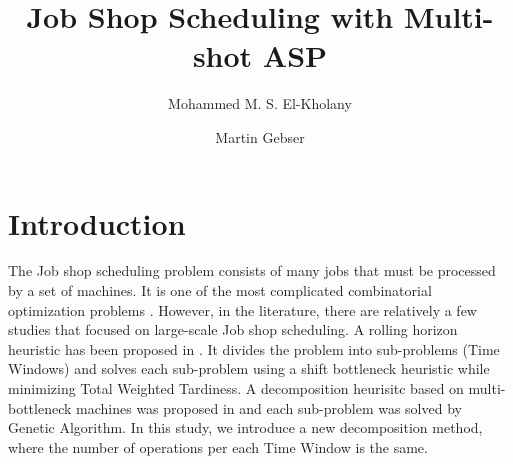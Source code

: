 \documentclass[runningheads]{llncs}
\begin{document}
%
\title{ Job Shop Scheduling with Multi-shot ASP}
%
%
\author{Mohammed M. S. El-Kholany \and Martin Gebser}
%
%
%
\maketitle              %
%
\section{Introduction}
The Job shop scheduling problem consists of many jobs that must be processed by a set of machines.
It is one of the most complicated combinatorial optimization problems \cite{lenstra1979computational}. However, in the literature, there are relatively a few studies that focused on large-scale Job shop scheduling. A rolling horizon heuristic has been proposed in \cite{singer2001decomposition}. It divides the problem into sub-problems (Time Windows) and solves each sub-problem using a shift bottleneck heuristic while minimizing Total Weighted Tardiness. A decomposition heurisitc based on multi-bottleneck machines was proposed in \cite{zhai2014decomposition} and each sub-problem was solved by Genetic Algorithm. In this study, we introduce a new decomposition method, where the number of operations per each Time Window is the same. 
\end{document}
